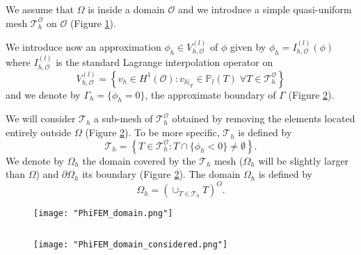 We assume that $\Omega$ is inside a domain $\mathcal{O}$ and we introduce a simple quasi-uniform mesh $\mathcal{T}_h^\mathcal{O}$ on $\mathcal{O}$ (Figure \ref{space2}).
 
We introduce now an approximation $\phi_h\in V_{h,\mathcal{O}}^{(l)}$ of $\phi$ given by $\phi_h=I_{h,\mathcal{O}}^{(l)}(\phi)$ where $I_{h,\mathcal{O}}^{(l)}$ is the standard Lagrange interpolation operator on
\begin{equation*}
	V_{h,\mathcal{O}}^{(l)}=\left\{v_h\in H^1(\mathcal{O}):v_{h|_T}\in\mathbb{P}_l(T) \;  \forall T\in\mathcal{T}_h^\mathcal{O}\right\}
\end{equation*}
and we denote by $\Gamma_h=\{\phi_h=0\}$, the approximate boundary of $\Gamma$ (Figure \ref{space3}).

We will consider $\mathcal{T}_h$ a sub-mesh of $\mathcal{T}_h^\mathcal{O}$ obtained by removing the elements located entirely outside $\Omega$ (Figure \ref{space3}). To be more specific, $\mathcal{T}_h$ is defined by
\begin{equation*}
	\mathcal{T}_h=\left\{T\in \mathcal{T}_h^\mathcal{O}:T\cap\{\phi_h<0\}\ne\emptyset\right\}.
\end{equation*}
We denote by $\Omega_h$ the domain covered by the $\mathcal{T}_h$ mesh ($\Omega_h$ will be slightly larger than $\Omega$) and $\partial\Omega_h$ its boundary (Figure \ref{space3}). The domain $\Omega_h$ is defined by
\begin{equation*}
	\Omega_h=\left(\cup_{T\in\mathcal{T}_h}T\right)^O.
\end{equation*}

\begin{minipage}{0.52\linewidth}
	\begin{figure}[H]
		\centering
		\texttt{[image: "PhiFEM\_domain.png"]}
		\label{space2}
	\end{figure}
\end{minipage} $\qquad$
\begin{minipage}{0.44\linewidth}
	\begin{figure}[H]
		\centering
		\texttt{[image: "PhiFEM\_domain\_considered.png"]}
		\label{space3}
	\end{figure}
\end{minipage}

